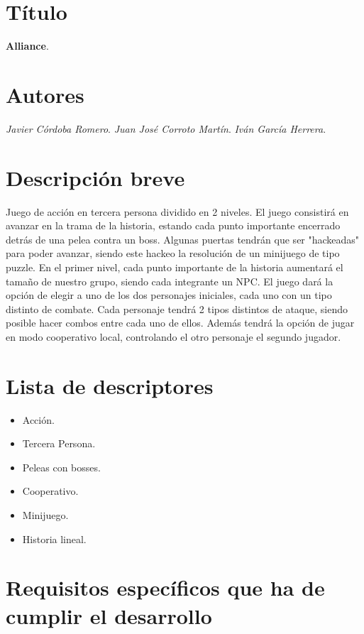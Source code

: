\documentclass[11pt, twoside]{article}
\begin{document}
\pagestyle{insection}
\section{Título}

\textbf{Alliance}.

\pagestyle{insection}
\section{Autores}
\textit{Javier Córdoba Romero}.
\textit{Juan José Corroto Martín}.
\textit{Iván García Herrera}.

\pagestyle{insection}
\section{Descripción breve}

Juego de acción en tercera persona dividido en 2 niveles. El juego consistirá en avanzar en la trama de la historia, estando cada punto importante encerrado detrás de una pelea contra un boss. Algunas puertas tendrán que ser "hackeadas" para poder avanzar, siendo este hackeo la resolución de un minijuego de tipo puzzle. En el primer nivel, cada punto importante de la historia aumentará el tamaño de nuestro grupo, siendo cada integrante un NPC. El juego dará la opción de elegir a uno de los dos personajes iniciales, cada uno con un tipo distinto de combate. Cada personaje tendrá 2 tipos distintos de ataque, siendo posible hacer combos entre cada uno de ellos. Además tendrá la opción de jugar en modo cooperativo local, controlando el otro personaje el segundo jugador.

\pagestyle{insection}
\section{Lista de descriptores}
\begin{itemize}
\item Acción.
\item Tercera Persona.
\item Peleas con bosses.
\item Cooperativo.
\item Minijuego.
\item Historia lineal.
\end{itemize}

\pagestyle{insection}
\section{Requisitos específicos que ha de cumplir el desarrollo}
\end{document}
